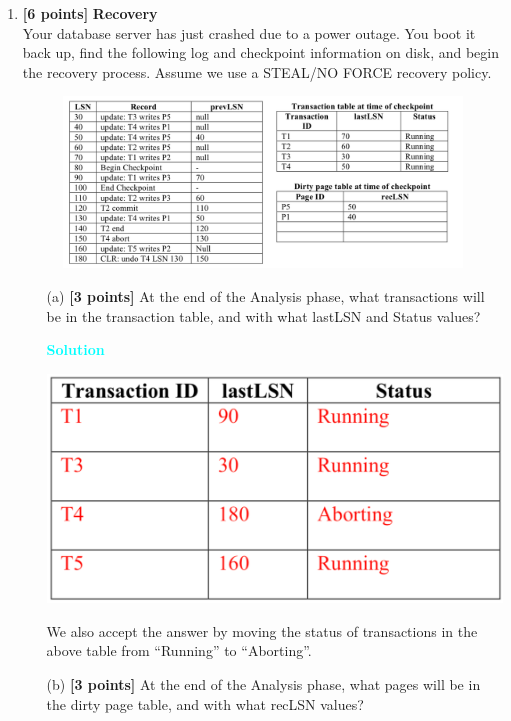 \documentclass[10pt]{article}
\newenvironment{solution}
    { \begin{mdframed}[backgroundcolor=gray!10] \textcolor{cyan}{\textbf{Solution}} \\}
    {  \end{mdframed}}
\begin{document}
\begin{enumerate}
	\item \textbf{[6 points]} \textbf{Recovery} \\
	      Your database server has just crashed due to a power outage.
	      You boot it back up, find the following log and checkpoint information on disk,
	      and begin the recovery process. Assume we use a STEAL/NO FORCE recovery policy.
	      \begin{figure}[h]
		      \centering
		      \includegraphics[width=\linewidth]{recovery}
		      \label{fig:recovery}
	      \end{figure}
	      \begin{itemize}
		      \item[(a)] \textbf{[3 points]}
		            At the end of the Analysis phase, what transactions will be in the transaction table,
		            and with what lastLSN and Status values?
		            \begin{solution}
			            \begin{center}
				            \includegraphics[width=.6\linewidth]{Xact_sol.png}
			            \end{center}
		            \end{solution}
		            We also accept the answer by moving the status of transactions in the above table from ``Running'' to ``Aborting''.
		      \item[(b)] \textbf{[3 points]}
		            At the end of the Analysis phase, what pages will be in the dirty page table, and with what recLSN values?

\end{itemize}
\end{enumerate}
\end{document}
